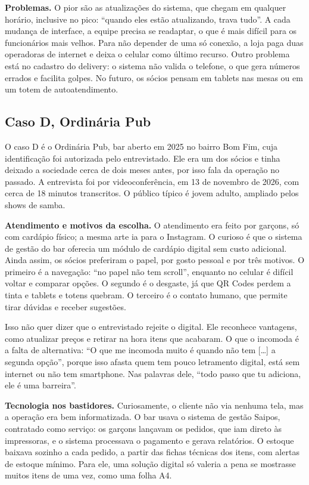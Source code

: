 \textbf{Problemas.} O pior são as atualizações do sistema, que chegam em qualquer horário, inclusive no pico: ``quando eles estão atualizando, trava tudo''. A cada mudança de interface, a equipe precisa se readaptar, o que é mais difícil para os funcionários mais velhos. Para não depender de uma só conexão, a loja paga duas operadoras de internet e deixa o celular como último recurso. Outro problema está no cadastro do delivery: o sistema não valida o telefone, o que gera números errados e facilita golpes. No futuro, os sócios pensam em tablets nas mesas ou em um totem de autoatendimento.

\subsection{Caso D, Ordinária Pub}
\label{sec:res-caso-d}

O caso D é o Ordinária Pub, bar aberto em 2025 no bairro Bom Fim, cuja identificação foi autorizada pelo entrevistado. Ele era um dos sócios e tinha deixado a sociedade cerca de dois meses antes, por isso fala da operação no passado. A entrevista foi por videoconferência, em 13 de novembro de 2026, com cerca de 18 minutos transcritos. O público típico é jovem adulto, ampliado pelos shows de samba.

\textbf{Atendimento e motivos da escolha.} O atendimento era feito por garçons, só com cardápio físico; a mesma arte ia para o Instagram. O curioso é que o sistema de gestão do bar oferecia um módulo de cardápio digital sem custo adicional. Ainda assim, os sócios preferiram o papel, por gosto pessoal e por três motivos. O primeiro é a navegação: ``no papel não tem scroll'', enquanto no celular é difícil voltar e comparar opções. O segundo é o desgaste, já que QR Codes perdem a tinta e tablets e totens quebram. O terceiro é o contato humano, que permite tirar dúvidas e receber sugestões.

Isso não quer dizer que o entrevistado rejeite o digital. Ele reconhece vantagens, como atualizar preços e retirar na hora itens que acabaram. O que o incomoda é a falta de alternativa: ``O que me incomoda muito é quando não tem [\ldots] a segunda opção'', porque isso afasta quem tem pouco letramento digital, está sem internet ou não tem smartphone. Nas palavras dele, ``todo passo que tu adiciona, ele é uma barreira''.

\textbf{Tecnologia nos bastidores.} Curiosamente, o cliente não via nenhuma tela, mas a operação era bem informatizada. O bar usava o sistema de gestão Saipos, contratado como serviço: os garçons lançavam os pedidos, que iam direto às impressoras, e o sistema processava o pagamento e gerava relatórios. O estoque baixava sozinho a cada pedido, a partir das fichas técnicas dos itens, com alertas de estoque mínimo. Para ele, uma solução digital só valeria a pena se mostrasse muitos itens de uma vez, como uma folha A4.

